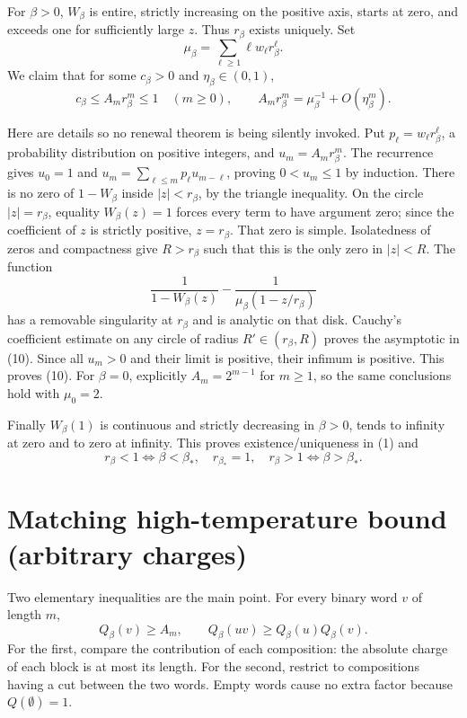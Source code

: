 \documentclass[11pt,a4paper]{report}
\begin{document}
For \(\beta>0\), \(W_\beta\) is entire, strictly increasing on the positive axis, starts at zero, and exceeds one for sufficiently large \(z\). Thus \(r_\beta\) exists uniquely. Set
\[\mu_\beta=\sum_{\ell\geq1}\ell w_\ell r_\beta^\ell.\]
We claim that for some \(c_\beta>0\) and \(\eta_\beta\in(0,1)\),
\[c_\beta\leq A_m r_\beta^m\leq1\quad(m\geq0),\qquad
 A_m r_\beta^m=\mu_\beta^{-1}+O(\eta_\beta^m).
 \tag{10}\]

Here are details so no renewal theorem is being silently invoked. Put \(p_\ell=w_\ell r_\beta^\ell\), a probability distribution on positive integers, and \(u_m=A_m r_\beta^m\). The recurrence gives \(u_0=1\) and \(u_m=\sum_{\ell\leq m}p_\ell u_{m-\ell}\), proving \(0<u_m\leq1\) by induction. There is no zero of \(1-W_\beta\) inside \(|z|<r_\beta\), by the triangle inequality. On the circle \(|z|=r_\beta\), equality \(W_\beta(z)=1\) forces every term to have argument zero; since the coefficient of \(z\) is strictly positive, \(z=r_\beta\). That zero is simple. Isolatedness of zeros and compactness give \(R>r_\beta\) such that this is the only zero in \(|z|<R\). The function
\[\frac1{1-W_\beta(z)}-\frac1{\mu_\beta(1-z/r_\beta)}\]
has a removable singularity at \(r_\beta\) and is analytic on that disk. Cauchy's coefficient estimate on any circle of radius \(R'\in(r_\beta,R)\) proves the asymptotic in (10). Since all \(u_m>0\) and their limit is positive, their infimum is positive. This proves (10). For \(\beta=0\), explicitly \(A_m=2^{m-1}\) for \(m\geq1\), so the same conclusions hold with \(\mu_0=2\).

Finally \(W_\beta(1)\) is continuous and strictly decreasing in \(\beta>0\), tends to infinity at zero and to zero at infinity. This proves existence/uniqueness in (1) and
\[r_\beta<1\iff\beta<\beta_*,\quad
 r_{\beta_*}=1,\quad r_\beta>1\iff\beta>\beta_*.
 \tag{11}\]

\section{Matching high-temperature bound (arbitrary charges)}

Two elementary inequalities are the main point. For every binary word \(v\) of length \(m\),
\[Q_\beta(v)\geq A_m,
 \qquad Q_\beta(uv)\geq Q_\beta(u)Q_\beta(v).
 \tag{12}\]
For the first, compare the contribution of each composition: the absolute charge of each block is at most its length. For the second, restrict to compositions having a cut between the two words. Empty words cause no extra factor because \(Q(\emptyset)=1\).
\end{document}
